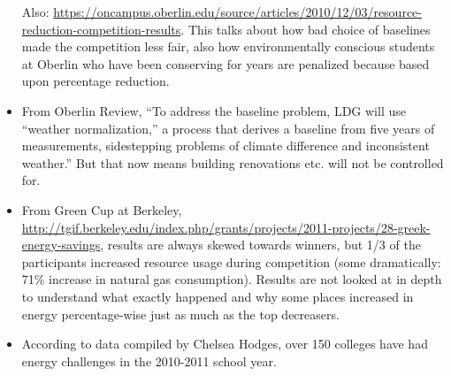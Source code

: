 \documentclass[jou]{apa} %
\begin{document}
\begin{itemize}
Also: 
\url{https://oncampus.oberlin.edu/source/articles/2010/12/03/resource-reduction-competition-results}.
This talks about how bad choice of baselines made the competition less fair, also how
environmentally conscious students at Oberlin who have been conserving for years are
penalized because based upon percentage reduction. 

\item From Oberlin Review, ``To address the baseline problem, LDG will use “weather
  normalization,” a process that derives a baseline from five years of measurements,
  sidestepping problems of climate difference and inconsistent weather.''  But that now
  means building renovations etc. will not be controlled for.

\item From Green Cup at Berkeley, 
\url{http://tgif.berkeley.edu/index.php/grants/projects/2011-projects/28-greek-energy-savings}, 
results are always skewed towards winners, but 1/3 of the participants increased resource
usage during competition (some dramatically: 71\% increase in natural gas consumption).
Results are not looked at in depth to understand what exactly happened and why some places
increased in energy percentage-wise just as much as the top decreasers.

\item According to data compiled by Chelsea Hodges, over 150 colleges have had energy
  challenges in the 2010-2011 school year.  


\end{itemize}

\end{document}
